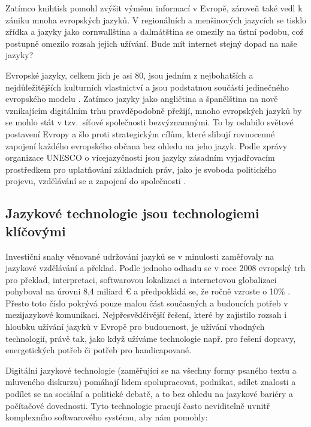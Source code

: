 \begin{multicols}{2}
Zatímco knihtisk pomohl zvýšit výměnu informací v Evropě, zároveň také vedl k zániku mnoha evropských jazyků. V regionálních a menšinových jazycích se tisklo zřídka a jazyky jako cornwallština a dalmátština se omezily na ústní podobu, což postupně omezilo rozsah jejich užívání. Bude mít internet stejný dopad na naše jazyky?


Evropské jazyky, celkem jich je asi 80, jsou jedním z nejbohatších a nejdůležitějších kulturních vlastnictví a jsou podstatnou součástí jedinečného evropského modelu \cite{EC2}. Zatímco jazyky jako angličtina a španělština na nově vznikajícím digitálním trhu pravděpodobně přežijí, mnoho evropských jazyků by se mohlo stát v tzv.~síťové společnosti bezvýznamnými. To by oslabilo světové postavení Evropy a šlo proti strategickým cílům, které slibují rovnocenné zapojení každého evropského občana bez ohledu na jeho jazyk. Podle zprávy organizace UNESCO o vícejazyčnosti jsou jazyky zásadním vyjadřovacím prostředkem pro uplatňování základních práv, jako je svoboda politického projevu, vzdělávání se a zapojení do společnosti \cite{Unesco1}.

\subsection{Jazykové technologie jsou technologiemi klíčovými}

Investiční snahy věnované udržování jazyků se v minulosti zaměřovaly na jazykové vzdělávání a překlad. Podle jednoho odhadu se v roce 2008 evropský trh pro překlad, interpretaci, softwarovou lokalizaci a internetovou globalizaci pohyboval na úrovni 8,4 miliard € a předpokládá se, že ročně vzroste o 10\% \cite{EC3}. Přesto toto číslo pokrývá pouze malou část současných a budoucích potřeb v mezijazykové komunikaci. Nejpřesvědčivější řešení, které by zajistilo rozsah i hloubku užívání jazyků v Evropě pro budoucnost, je užívání vhodných technologií, právě tak, jako když užíváme technologie např. pro řešení dopravy, energetických potřeb či potřeb pro handicapované.

Digitální jazykové technologie (zaměřující se na všechny formy psaného textu a mluveného diskurzu) pomáhají lidem spolupracovat, podnikat, sdílet znalosti a podílet se na sociální a politické debatě, a to bez ohledu na jazykové bariéry a počítačové dovednosti. Tyto technologie pracují často neviditelně uvnitř komplexního softwarového systému, aby nám pomohly:


\end{multicols}
